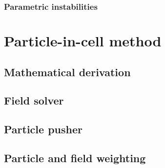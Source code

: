 \documentclass[12pt, twoside, a4paper, openright]{report}
\begin{document}
\subsection{Parametric instabilities}


%

%

%

%


\chapter{Particle-in-cell method}


\section{Mathematical derivation}


\section{Field solver}


\section{Particle pusher}


\section{Particle and field weighting}

\end{document}
